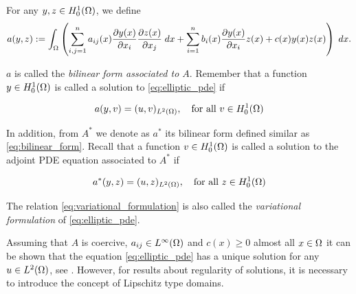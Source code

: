 For any $y,z \in H_0^1(\Omega)$, we define 
\begin{equation}\label{eq:bilinear_form}    
    a(y,z):=\int_{\Omega}\left(\sum_{i,j=1}^{n} a_{ij}(x)\frac{\partial y(x)}{\partial x_i}\frac{\partial z(x)}{\partial x_{j}}\; dx+\sum_{i=1}^{n}b_i(x)\frac{\partial y(x)}{\partial x_i}z(x)+c(x)y(x)z(x) \right)\; dx.
\end{equation}

$a$ is called the \textit{bilinear form associated to $A$}. Remember that a function $y\in H_0^1(\Omega)$ is called a solution to \eqref{eq:elliptic_pde} if

\begin{equation}\label{eq:variational_formulation}
a(y,v)=(u,v)_{L^2(\Omega)}, \quad \mbox{for all }v\in H_0^1(\Omega)
\end{equation}

In addition, from $A^*$ we denote as $a^*$ its bilinear form defined similar as \eqref{eq:bilinear_form}. Recall 
that a function $v\in H_0^1(\Omega)$ is called a solution to the adjoint PDE equation associated to $A^*$ if 

\begin{equation}\label{eq:variational_formulation*}
a^*(y,z)=(u,z)_{L^2(\Omega)}, \quad \mbox{for all }z\in H_0^1(\Omega)
\end{equation}


The relation \eqref{eq:variational_formulation} is also called the \textit{variational formulation} of \eqref{eq:elliptic_pde}.

Assuming that $A$ is coercive, $a_{ij}\in L^{\infty}(\Omega)$ and $c(x)\ge 0$ almost all $x\in\Omega$ it can 
be shown that the equation \eqref{eq:elliptic_pde} has a unique solution for any $u\in L^2(\Omega)$, 
see \cite[Remark 23]{brezis}. However, for results about regularity of solutions, it is necessary to introduce the concept of Lipschitz type domains.
 
